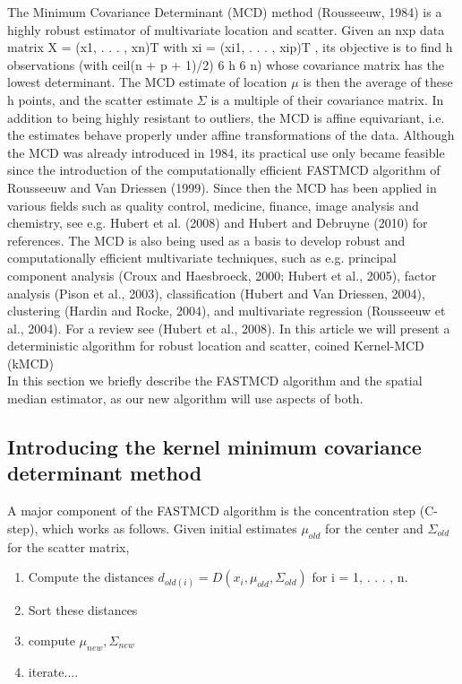 \documentclass[preprint,12pt]{elsarticle}
\begin{document}
The Minimum Covariance Determinant (MCD) method (Rousseeuw, 1984) is a highly robust
estimator of multivariate location and scatter. Given an nxp data matrix X = (x1, . . . , xn)T with xi = (xi1, . . . , xip)T , its objective is to find h observations (with ceil(n + p + 1)/2) 6 h 6 n) whose covariance matrix has the lowest determinant. The MCD estimate of location $\mu$ is then the average of these h points, and the scatter estimate $\Sigma$ is a multiple of their covariance matrix. In addition to being highly resistant to outliers, the MCD is affine equivariant, i.e. the estimates behave properly under affine transformations of the data. Although the MCD was already introduced in 1984, its practical use only became feasible
since the introduction of the computationally efficient FASTMCD algorithm of Rousseeuw and
Van Driessen (1999). Since then the MCD has been applied in various fields such as quality
control, medicine, finance, image analysis and chemistry, see e.g. Hubert et al. (2008) and Hubert
and Debruyne (2010) for references. The MCD is also being used as a basis to develop
robust and computationally efficient multivariate techniques, such as e.g. principal component
analysis (Croux and Haesbroeck, 2000; Hubert et al., 2005), factor analysis (Pison et al., 2003),
classification (Hubert and Van Driessen, 2004), clustering (Hardin and Rocke, 2004), and multivariate regression (Rousseeuw et al., 2004). For a review see (Hubert et al., 2008).
In this article we will present a deterministic algorithm for robust location and scatter, coined Kernel-MCD (kMCD) \\

In this section we briefly describe the FASTMCD algorithm and the spatial median estimator, as our new algorithm will use aspects of both.

\subsection{Introducing the kernel minimum covariance determinant method}

A major component of the FASTMCD algorithm is the concentration step (C-step), which works
as follows. Given initial estimates $\mu_{old}$ for the center and $\Sigma_{old}$ for the scatter matrix,

\begin{enumerate}
	\item Compute the distances $d_{old(i)} = D(x_i, \mu_{old}, \Sigma_{old})$ for i = 1, . . . , n.
	\item Sort these distances
	\item compute $\mu_{new}, \Sigma_{new}$
	\item iterate....
\end{enumerate}
\end{document}
